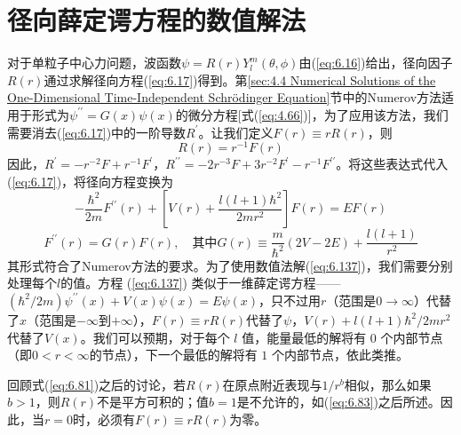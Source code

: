 \section{径向薛定谔方程的数值解法}
\label{sec:6.9 Numerical Solution of the Radial Schrödinger Equation}
    对于单粒子中心力问题，波函数$\psi = R\left(r\right)Y_l^m\left(\theta,\phi\right)$由(\ref{eq:6.16})给出，径向因子$R\left(r\right)$通过求解径向方程(\ref{eq:6.17})得到。第\ref{sec:4.4 Numerical Solutions of the One-Dimensional Time-Independent Schrödinger Equation}节中的Numerov方法适用于形式为$\psi^{\prime\prime} = G\left(x\right)\psi\left(x\right)$的微分方程[式(\ref{eq:4.66})]，为了应用该方法，我们需要消去(\ref{eq:6.17})中的一阶导数$R^{\prime}$。让我们定义$F\left(r\right) \equiv rR\left(r\right)$，则
    \begin{equation}
        R\left(r\right) = r^{-1}F\left(r\right)
        \label{eq:6.136}
    \end{equation}
    因此，$R^{\prime} = -r^{-2}F + r^{-1}F^{\prime}$，$R^{\prime\prime} = -2r^{-3}F + 3r^{-2}F^{\prime} - r^{-1}F^{\prime\prime}$。将这些表达式代入(\ref{eq:6.17})，将径向方程变换为
    \begin{equation}
        -\frac{\hbar^2}{2m}F^{\prime\prime}\left(r\right)+\left[V\left(r\right)+\frac{l\left(l+1\right)\hbar^2}{2mr^2}\right]F\left(r\right) = EF\left(r\right)
        \label{eq:6.137}
    \end{equation}
    \begin{equation}
        F^{\prime\prime}\left(r\right) = G\left(r\right)F\left(r\right), \quad \text{其中}G\left(r\right) \equiv \frac{m}{\hbar^2}\left(2V-2E\right)+ \frac{l\left(l+1\right)}{r^2}
        \label{eq:6.138}
    \end{equation}
    其形式符合了Numerov方法的要求。为了使用数值法解(\ref{eq:6.137})，我们需要分别处理每个$l$的值。方程 (\ref{eq:6.137}) 类似于一维薛定谔方程——$\left(\hbar^2/2m\right)\psi^{\prime\prime}\left(x\right)+V\left(x\right)\psi\left(x\right) = E\psi\left(x\right)$，只不过用$r$（范围是$0 \to \infty$）代替了$x$（范围是$-\infty$到$+\infty$），$F\left(r\right) \equiv rR\left(r\right)$代替了$\psi$，$V\left(r\right) + l\left(l+1\right)\hbar^2/2mr^2$代替了$V\left(x\right)$。我们可以预期，对于每个 $l$ 值，能量最低的解将有 $0$ 个内部节点（即$0<r<\infty$的节点），下一个最低的解将有 $1$ 个内部节点，依此类推。

    回顾式(\ref{eq:6.81})之后的讨论，若$R\left(r\right)$在原点附近表现与$1/r^b$相似，那么如果$b>1$，则$R\left(r\right)$不是平方可积的；值$b=1$是不允许的，如(\ref{eq:6.83})之后所述。因此，当$r=0$时，必须有$F\left(r\right)\equiv rR\left(r\right)$为零。

